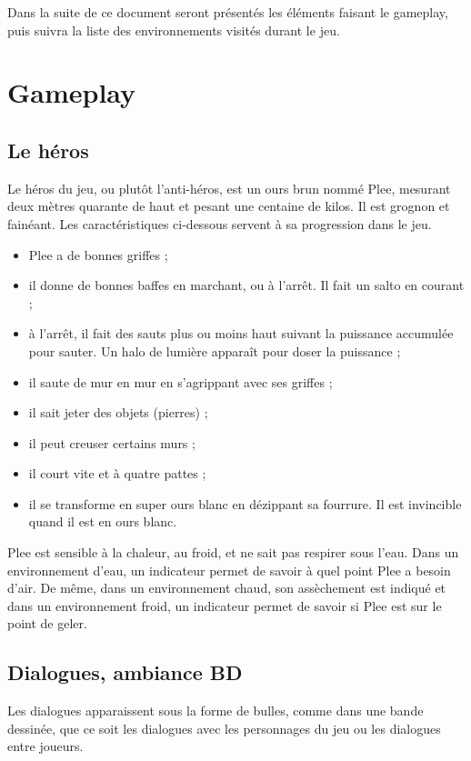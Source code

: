 \documentclass{article}
\begin{document}
Dans la suite de ce document seront présentés les éléments faisant le
gameplay, puis suivra la liste des environnements visités durant le
jeu.

\section{Gameplay}

\subsection{Le héros}

Le héros du jeu, ou plutôt l'anti-héros, est un ours brun nommé Plee,
mesurant deux mètres quarante de haut et pesant une centaine de
kilos. Il est grognon et fainéant. Les caractéristiques ci-dessous
servent à sa progression dans le jeu.
\begin{itemize}
\item Plee a de bonnes griffes ;
\item il donne de bonnes baffes en marchant, ou à l'arrêt. Il fait un
      salto en courant ;
\item à l'arrêt, il fait des sauts plus ou moins haut suivant la puissance
      accumulée pour sauter. Un halo de lumière apparaît pour doser la
      puissance ;
\item il saute de mur en mur en s'agrippant avec ses griffes ;
\item il sait jeter des objets (pierres) ;
\item il peut creuser certains murs ;
\item il court vite et à quatre pattes ;
\item il se transforme en super ours blanc en dézippant sa
      fourrure. Il est invincible quand il est en ours blanc.
\end{itemize}

Plee est sensible à la chaleur, au froid, et ne sait pas respirer sous
l'eau. Dans un environnement d'eau, un indicateur permet de savoir à
quel point Plee a besoin d'air. De même, dans un environnement chaud,
son assèchement est indiqué et dans un environnement froid, un
indicateur permet de savoir si Plee est sur le point de geler.

\subsection{Dialogues, ambiance BD}
Les dialogues apparaissent sous la forme de bulles, comme dans une
bande dessinée, que ce soit les dialogues avec les personnages du jeu
ou les dialogues entre joueurs.
\end{document}
